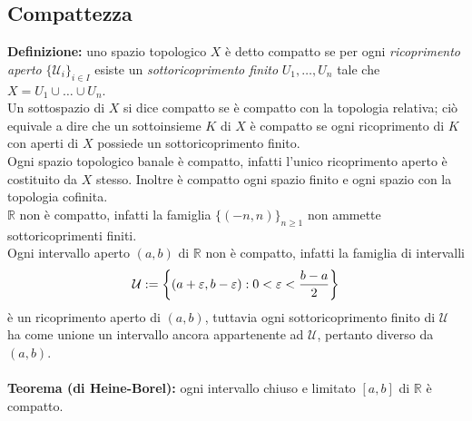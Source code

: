 \documentclass{article}
\begin{document}
\subsection{Compattezza}
\textbf{Definizione:} uno spazio topologico $X$ è detto compatto se per ogni \textit{ricoprimento aperto} $\{ \mathcal{U}_i \}_{i \in I}$ esiste un \textit{sottoricoprimento finito} $U_1, \dots, U_n$ tale che $X = U_1 \cup \dots \cup U_n$. \\
Un sottospazio di $X$ si dice compatto se è compatto con la topologia relativa; ciò equivale a dire che un sottoinsieme $K$ di $X$ è compatto se ogni ricoprimento di $K$ con aperti di $X$ possiede un sottoricoprimento finito. \\
Ogni spazio topologico banale è compatto, infatti l'unico ricoprimento aperto è costituito da $X$ stesso. Inoltre è compatto ogni spazio finito e ogni spazio con la topologia cofinita. \\
$\mathbb{R}$ non è compatto, infatti la famiglia $\{ (-n, n) \}_{n \geq 1}$ non ammette sottoricoprimenti finiti. \\
Ogni intervallo aperto $(a, b)$ di $\mathbb{R}$ non è compatto, infatti la famiglia di intervalli
\begin{gather}
    \mathcal{U} := \left\{ (a + \varepsilon, b - \varepsilon) : 0 < \varepsilon < \frac{b - a}{2} \right\} \notag
\end{gather}
è un ricoprimento aperto di $(a, b)$, tuttavia ogni sottoricoprimento finito di $\mathcal{U}$ ha come unione un intervallo ancora appartenente ad $\mathcal{U}$, pertanto diverso da $(a, b)$. \\ \\
\textbf{Teorema (di Heine-Borel):} ogni intervallo chiuso e limitato $[a, b]$ di $\mathbb{R}$ è compatto. \\
\end{document}

